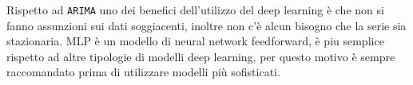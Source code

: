 Rispetto ad \verb|ARIMA| uno dei benefici dell'utilizzo del deep learning è che non si fanno assunzioni sui dati soggiacenti, inoltre non c'è
alcun bisogno che la serie sia stazionaria. MLP è un modello di neural network feedforward, è piu semplice rispetto ad altre tipologie di modelli deep learning,
per questo motivo è sempre raccomandato prima di utilizzare modelli più sofisticati.

